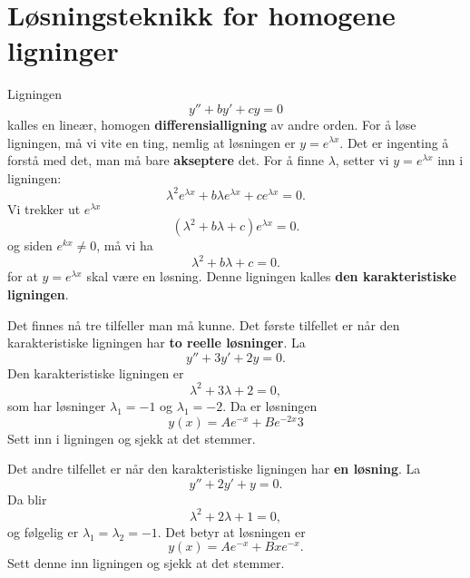 \section*{Løsningsteknikk for homogene ligninger}
Ligningen
\begin{equation*}
y'' +by' + cy=0
\end{equation*}
kalles en line{\ae}r, homogen \textbf{differensialligning} av andre orden.
For {\aa} l{\o}se ligningen, m{\aa} vi vite en ting, nemlig at l{\o}sningen er $y=e^{\lambda x}$. 
Det er ingenting {\aa} forst{\aa} med det, man m{\aa} bare \textbf{akseptere} det. 
For {\aa} finne $\lambda $, setter vi $y=e^{\lambda x}$ inn i ligningen:
\begin{equation*}
\lambda ^{2}e^{\lambda x} +b\lambda e^{\lambda x} + ce^{\lambda x}=0.
\end{equation*}
Vi trekker ut $e^{\lambda x}$
\begin{equation*}
(\lambda ^{2} +b\lambda  + c)e^{\lambda x}=0.
\end{equation*}
og siden $e^{kx}\neq 0$, m{\aa} vi ha
\begin{equation*}
\lambda ^{2} +b\lambda  + c=0.
\end{equation*}
for at $y=e^{\lambda x}$ skal v{\ae}re en l{\o}sning. Denne ligningen kalles \textbf{den karakteristiske ligningen}. 

Det finnes n{\aa} tre tilfeller man m{\aa} kunne. Det f{\o}rste tilfellet er n{\aa}r den karakteristiske ligningen har \textbf{to reelle l{\o}sninger}. La
\begin{equation*}
y'' +3y' + 2y=0.
\end{equation*}
Den karakteristiske ligningen er 
\begin{equation*}
\lambda ^{2} +3\lambda  + 2=0,
\end{equation*}
som har l{\o}sninger $\lambda_{1} =-1$ og $\lambda_{1} =-2$. Da er l{\o}sningen 
\begin{equation*}
\boxed{y(x)=Ae^{-x}+Be^{-2x}}3
\end{equation*}
Sett inn i ligningen og sjekk at det stemmer.


Det andre tilfellet er n{\aa}r den karakteristiske ligningen har \textbf{en l{\o}sning}. La
\begin{equation*}
y'' +2y' + y=0.
\end{equation*}
Da blir 
\begin{equation*}
\lambda ^{2} +2\lambda  + 1=0,
\end{equation*}
og f{\o}lgelig er $\lambda_{1}=\lambda _{2} =-1$. Det betyr at l{\o}sningen er 
\begin{equation*}
\boxed{y(x)=Ae^{-x}+Bxe^{-x}}.
\end{equation*}
Sett denne inn ligningen og sjekk at det stemmer.


